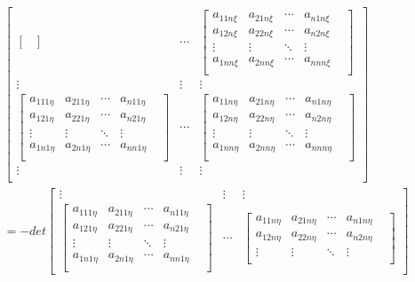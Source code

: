 \documentclass{amsc}          %
\numberwithin{equation}{section} %
\begin{document}
\begin{list}{}
\begin{align*}
\begin{bmatrix}
\begin{bmatrix}
\end{bmatrix}&
\cdots&
\begin{bmatrix}
  a_{11n\xi}& a_{21n\xi}&\cdots&a_{n1n\xi}\\
  a_{12n\xi}& a_{22n\xi}&\cdots&a_{n2n\xi}\\
  \vdots&\vdots&\ddots &\vdots& \\
 a_{1nn\xi}& a_{2nn\xi}&\cdots&a_{nnn\xi}\\
 \end{bmatrix}\\
\vdots&\vdots&\vdots\\
\begin{bmatrix}
  a_{111\eta}& a_{211\eta}&\cdots&a_{n11\eta}\\
  a_{121\eta}& a_{221\eta}&\cdots&a_{n21\eta}\\
  \vdots&\vdots&\ddots &\vdots& \\
   a_{1n1\eta}& a_{2n1\eta}&\cdots&a_{nn1\eta}\\
   \end{bmatrix}&
\cdots&
\begin{bmatrix}
  a_{11n\eta}& a_{21n\eta}&\cdots&a_{n1n\eta}\\
  a_{12n\eta}& a_{22n\eta}&\cdots&a_{n2n\eta}\\
  \vdots&\vdots&\ddots &\vdots& \\
   a_{1nn\eta }& a_{2nn\eta}&\cdots&a_{nnn\eta}\\
   \end{bmatrix}\\
\vdots&\vdots&\vdots\\
    \end{bmatrix}\\
=-det
  \begin{bmatrix}
\vdots&\vdots&\vdots\\
 \begin{bmatrix}
   a_{111\eta}& a_{211\eta}&\cdots&a_{n11\eta}\\
   a_{121\eta}& a_{221\eta}&\cdots&a_{n21\eta}\\
  \vdots&\vdots&\ddots &\vdots& \\
   a_{1n1\eta}& a_{2n1\eta}&\cdots&a_{nn1\eta}\\
   \end{bmatrix}&
\cdots&
\begin{bmatrix}
  a_{11n\eta}& a_{21n\eta}&\cdots&a_{n1n\eta}\\
  a_{12n\eta}& a_{22n\eta}&\cdots&a_{n2n\eta}\\
  \vdots&\vdots&\ddots &\vdots& \\

\end{bmatrix}
\end{bmatrix}
\end{align*}
\end{list}
\end{document}
